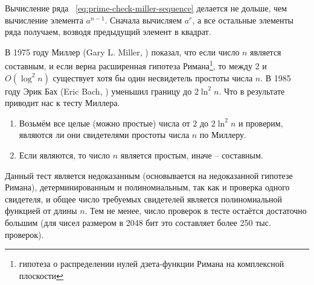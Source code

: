 Вычисление ряда ~\ref{eq:prime-check-miller-sequence} делается не дольше, чем вычисление элемента $a^{n-1}$. Сначала вычисляем $a^{r}$, а все остальные элементы ряда получаем, возводя предыдущий элемент в квадрат.

В 1975 году Миллер (Gary L. Miller, \cite{Miller:1975, Miller:1976}) показал, что если число $n$ является составным, и если верна расширенная гипотеза Римана\footnote{гипотеза о распределении нулей дзета-функции Римана на комплексной плоскости}, то между 2 и $O \left( \log^2 n \right)$ существует хотя бы один несвидетель простоты числа $n$. В 1985 году Эрик Бах (Eric Bach, \cite{Bach:1990}) уменьшил границу до $2 \ln^2 n$. Что в результате приводит нас к тесту Миллера.

\begin{enumerate}
	\item Возьмём все целые (можно простые) числа от $2$ до $2 \ln^2 n $ и проверим, являются ли они свидетелями простоты числа $n$ по Миллеру.
	\item Если являются, то число $n$ является простым, иначе -- составным.
\end{enumerate}

Данный тест является недоказанным (основывается на недоказанной гипотезе Римана), детерминированным и полиномиальным, так как и проверка одного свидетеля, и общее число требуемых свидетелей является полиномиальной функцией от длины $n$. Тем не менее, число проверок в тесте остаётся достаточно большим (для чисел размером в 2048 бит это составляет более 250 тыс. проверок).
